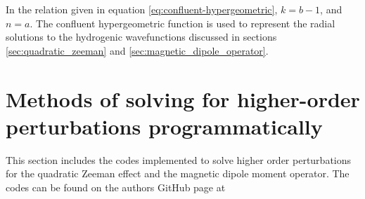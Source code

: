         \noindent In the relation given in equation \eqref{eq:confluent-hypergeometric}, $k = {b-1}$, and $n = a$. The confluent hypergeometric function is used to represent the radial solutions to the hydrogenic wavefunctions discussed in sections \ref{sec:quadratic_zeeman} and \ref{sec:magnetic_dipole_operator}.


\chapter{Methods of solving for higher-order perturbations programmatically} \label{sec:Program_perturbation}
    This section includes the codes implemented to solve higher order perturbations for the quadratic Zeeman effect and the magnetic dipole moment operator. The codes can be found on the authors GitHub page at